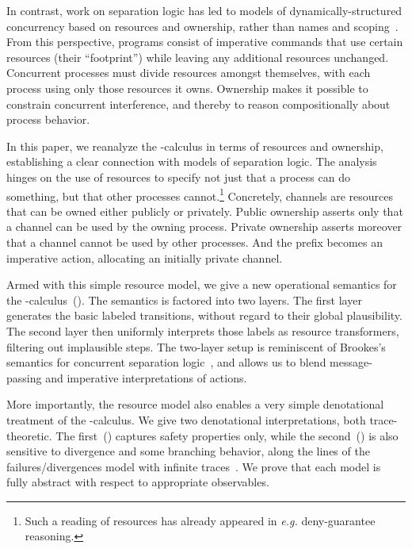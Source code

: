 \documentclass{entcs}
\begin{document}
In contrast, work on separation logic has led to models of
dynamically-structured concurrency based on resources and ownership,
rather than names and scoping~\cite{Brookes2007,Calcagno2007}.  From
this perspective, programs consist of imperative commands that use
certain resources (their ``footprint'') while leaving any additional
resources unchanged.  Concurrent processes must divide resources
amongst themselves, with each process using only those resources it
owns.  Ownership makes it possible to constrain concurrent
interference, and thereby to reason compositionally about process
behavior.

In this paper, we reanalyze the -calculus in terms of resources
and ownership, establishing a clear connection with models of
separation logic.  The analysis hinges on the use of resources to
specify not just that a process can do something, but that other
processes cannot.\footnote{ Such a reading of resources has already
  appeared in \emph{e.g.} deny-guarantee reasoning\cite{Dodds2009}.  }
Concretely, channels are resources that can be owned either publicly
or privately.  Public ownership asserts only that a channel can be
used by the owning process.  Private ownership asserts moreover that a
channel cannot be used by other processes.  And the prefix 
becomes an imperative action, allocating an initially private
channel.



Armed with this simple resource model, we give a new operational
semantics for the -calculus~().  The
semantics is factored into two layers.  The first layer generates the
basic labeled transitions, without regard to their global
plausibility.  The second layer then uniformly interprets those labels
as resource transformers, filtering out implausible steps.  The
two-layer setup is reminiscent of Brookes's semantics for concurrent
separation logic~\cite{Brookes2007,Brookes2002}, and allows us to
blend message-passing and imperative interpretations of actions.



More importantly, the resource model also enables a very simple
denotational treatment of the -calculus.  We give two
denotational interpretations, both trace-theoretic.  The
first~() captures safety properties only, while the
second~() is also sensitive to divergence and some
branching behavior, along the lines of the failures/divergences model
with infinite traces~\cite{Roscoe1993}.  We prove that each model is
fully abstract with respect to  appropriate observables.
\end{document}
